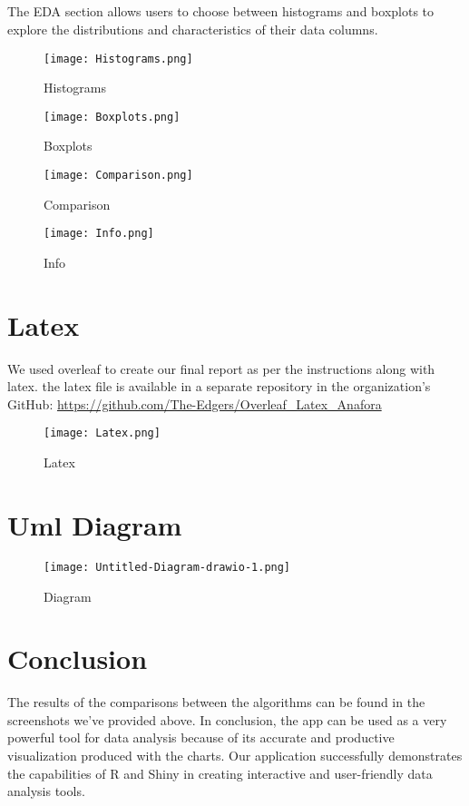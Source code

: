 \documentclass{article}
\begin{document}
\subsection{}The EDA section allows users to choose between histograms and boxplots to explore the distributions and characteristics of their data columns.
\begin{figure}[H]
    \centering
    \texttt{[image: Histograms.png]}
    \caption{Histograms}
\end{figure}
\begin{figure}[H]
    \centering
    \texttt{[image: Boxplots.png]}
    \caption{Boxplots}
\end{figure}
\begin{figure}[H]
    \centering
    \texttt{[image: Comparison.png]}
    \caption{Comparison}
\end{figure}
\begin{figure}[H]
    \centering
    \texttt{[image: Info.png]}
    \caption{Info}
\end{figure}

\section{Latex}We used overleaf to create our final report as per the instructions along with latex. the latex file is available in a separate repository in the organization's GitHub:
\url{https://github.com/The-Edgers/Overleaf_Latex_Anafora}
\begin{figure}[H]
    \centering
    \texttt{[image: Latex.png]}
    \caption{Latex}
\end{figure}

\section{Uml Diagram}
\begin{figure}[H]
    \centering
    \texttt{[image: Untitled-Diagram-drawio-1.png]}
    \caption{Diagram}
\end{figure}

\section{Conclusion}The results of the comparisons between the algorithms can be found in the screenshots we've provided above.
In conclusion, the app can be used as a very powerful tool for data analysis because of its accurate and productive visualization produced with the charts.  Our application successfully demonstrates the capabilities of R and Shiny in creating interactive and user-friendly data analysis tools.
\end{document}
